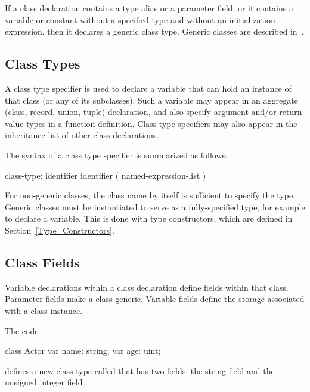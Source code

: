 If a class declaration contains a type alias or a parameter field, or it contains a variable or
constant without a specified type and without an initialization
expression, then it declares a generic class type.  Generic classes are described
in~.

\subsection{Class Types}
\label{Class_Types}

A class type specifier is used to declare a variable that can hold an instance
of that class (or any of its subclasses).  Such a variable may appear in an
aggregate (class, record, union, tuple) declaration, and also specify argument
and/or return value types in a function definition.  
Class type specifiers may also appear in the
inheritance list of other class declarations.

The syntax of a class type specifier is summarized as follows:
\begin{syntax}
class-type:
  identifier
  identifier ( named-expression-list )
\end{syntax}
For non-generic classes, the class name by itself is sufficient to specify the
type.  Generic classes must be instantiated to serve as a fully-specified
type, for example to declare a variable.  This is done with
type constructors, which are defined in Section~\ref{Type_Constructors}.

\subsection{Class Fields}
\label{Class_Fields}

Variable declarations within a class declaration define
fields within that class.  Parameter fields make a class generic.
Variable fields define the storage associated with a class instance.

\begin{example}
The code
\begin{chapelpre}
\end{chapelpre}
\begin{chapel}
class Actor {
  var name: string;
  var age: uint;
}
\end{chapel}
\begin{chapeloutput}
\end{chapeloutput}
defines a new class type called  that has two fields: the
string field  and the unsigned integer field .
\end{example}

